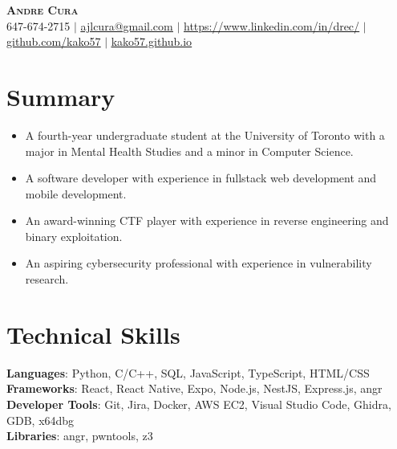 \documentclass[letterpaper,11pt]{article}
\newcommand{\resumeItem}[1]{
  \item\small{
    {#1 \vspace{-2pt}}
  }
}
\newcommand{\resumeItemListStart}{\begin{itemize}}
\newcommand{\resumeItemListEnd}{\end{itemize}\vspace{-5pt}}
\begin{document}

\begin{center}
  \textbf{\Huge \scshape Andre Cura} \\ \vspace{1pt}
  \small 647-674-2715 $|$ \href{mailto:ajlcura@gmail.com}{\underline{ajlcura@gmail.com}} $|$ 
  \href{https://www.linkedin.com/in/drec/}{\underline{https://www.linkedin.com/in/drec/}} $|$
  \href{https://github.com/kako57}{\underline{github.com/kako57}} $|$
  \href{https://kako57.github.io}{\underline{kako57.github.io}}\\
\end{center}

\section{Summary}
  \begin{itemize}[leftmargin=0.15in, label={}]
    \small{\item{
      \resumeItemListStart
        \resumeItem{A fourth-year undergraduate student at the University of Toronto with a major in Mental Health Studies and a minor in Computer Science.}
        \resumeItem{A software developer with experience in fullstack web development and mobile development.}
        \resumeItem{An award-winning CTF player with experience in reverse engineering and binary exploitation.}
        \resumeItem{An aspiring cybersecurity professional with experience in vulnerability research.}
      \resumeItemListEnd
    }}
  \end{itemize}

\section{Technical Skills}
 \begin{itemize}[leftmargin=0.15in, label={}]
    \small{\item{
      \textbf{Languages}{: Python, C/C++, SQL, JavaScript, TypeScript, HTML/CSS} \\
      \textbf{Frameworks}{: React, React Native, Expo, Node.js, NestJS, Express.js, angr} \\
      \textbf{Developer Tools}{: Git, Jira, Docker, AWS EC2, Visual Studio Code, Ghidra, GDB, x64dbg} \\
      \textbf{Libraries}{: angr, pwntools, z3 }
    }}
 \end{itemize}
\end{document}
